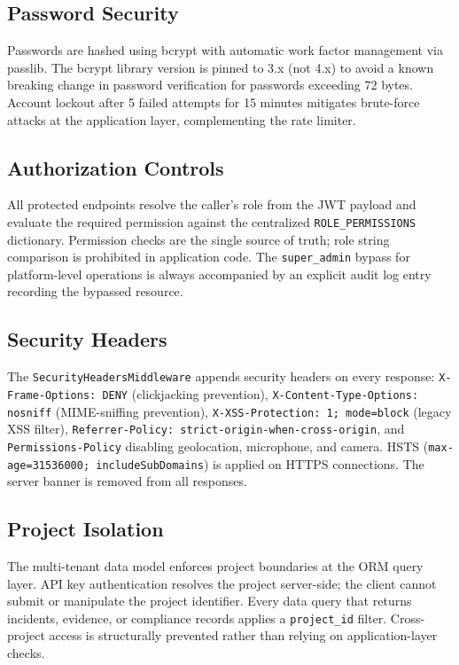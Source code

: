 \documentclass[conference]{IEEEtran}
\begin{document}
\subsection{Password Security}

Passwords are hashed using bcrypt with automatic work factor management via passlib. The bcrypt library version is pinned to 3.x (not 4.x) to avoid a known breaking change in password verification for passwords exceeding 72 bytes. Account lockout after 5 failed attempts for 15 minutes mitigates brute-force attacks at the application layer, complementing the rate limiter.

\subsection{Authorization Controls}

All protected endpoints resolve the caller's role from the JWT payload and evaluate the required permission against the centralized \texttt{ROLE\_PERMISSIONS} dictionary. Permission checks are the single source of truth; role string comparison is prohibited in application code. The \texttt{super\_admin} bypass for platform-level operations is always accompanied by an explicit audit log entry recording the bypassed resource.

\subsection{Security Headers}

The \texttt{SecurityHeadersMiddleware} appends security headers on every response: \texttt{X-Frame-Options: DENY} (clickjacking prevention), \texttt{X-Content-Type-Options: nosniff} (MIME-sniffing prevention), \texttt{X-XSS-Protection: 1; mode=block} (legacy XSS filter), \texttt{Referrer-Policy: strict-origin-when-cross-origin}, and \texttt{Permissions-Policy} disabling geolocation, microphone, and camera. HSTS (\texttt{max-age=31536000; includeSubDomains}) is applied on HTTPS connections. The server banner is removed from all responses.

\subsection{Project Isolation}

The multi-tenant data model enforces project boundaries at the ORM query layer. API key authentication resolves the project server-side; the client cannot submit or manipulate the project identifier. Every data query that returns incidents, evidence, or compliance records applies a \texttt{project\_id} filter. Cross-project access is structurally prevented rather than relying on application-layer checks.
\end{document}
